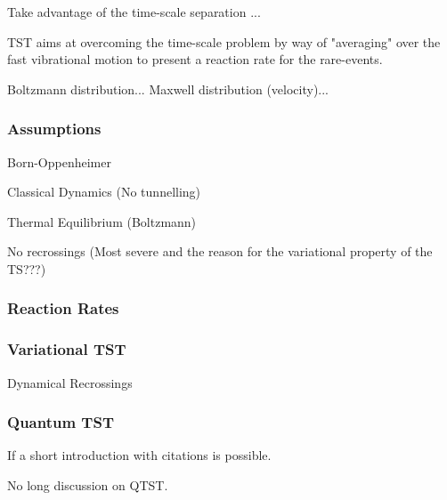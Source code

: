 Take advantage of the time-scale separation ...

TST aims at overcoming the time-scale problem by way of "averaging" over the fast vibrational motion to present a reaction rate for the rare-events.

Boltzmann distribution...
Maxwell distribution (velocity)...

\incomplete

\subsubsection{Assumptions}
\bit
\item Born-Oppenheimer
\item Classical Dynamics (No tunnelling)
\item Thermal Equilibrium (Boltzmann)
\item No recrossings (Most severe and the reason for the variational property of the TS???)
\eit
\placeholder

\subsubsection{Reaction Rates}
\placeholder

\subsubsection{Variational TST}
\bit
\item Dynamical Recrossings
\eit

\subsubsection{Quantum TST}
\bit
\item If a short introduction with citations is possible.
\item No long discussion on QTST.
\eit

%

